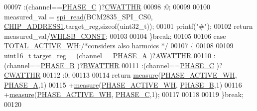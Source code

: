 \begin{DoxyCode}
00097                                           :(channel==\hyperlink{a00043_a3ceb83fb10c2af19b468d508448f24e2}{PHASE\_C} )?\hyperlink{a00036_ad685baf76950c0387bedffa9bb3272a9}{CWATTHR}
00098                                           :0;           
00099                                           
00100                     measured\_val = \hyperlink{a00007_ga7ad9f65ee46aca507374096506a0b1c4}{spi\_read}(BCM2835\_SPI\_CS0,
      \hyperlink{a00037_a94de2b046db6e10257ef4481c0a15eaa}{CHIP\_ADDRESS1},target\_reg,\textcolor{keyword}{sizeof}(uint32\_t));
00101                     printf(\textcolor{stringliteral}{"#"});
00102                     \textcolor{keywordflow}{return} measured\_val/\hyperlink{a00037_a75a052821a52067f93124e0c7ddcfdc3}{WHLSB\_CONST};
00103                 
00104                 \}\textcolor{keywordflow}{break};
00105                 
00106                 \textcolor{keywordflow}{case}  \hyperlink{a00043_ad8d2fc353ef124a8144e6d8264e43d1a}{TOTAL\_ACTIVE\_WH}:\textcolor{comment}{/*considers also harmoics */}
00107                 \{
00108                     
00109                     uint16\_t target\_reg =  (channel==\hyperlink{a00043_ad214039f52b011ce2bd6c85ff98a981b}{PHASE\_A} )?\hyperlink{a00036_ae66c97ed86f47fd938f143a30a8b2f7e}{AWATTHR}
00110                                           :(channel==\hyperlink{a00043_ad7b96feed1e1c12515dad5e926b2c62e}{PHASE\_B} )?\hyperlink{a00036_a185c6910fa47f7e973f0f8743ef0e8ad}{BWATTHR}
00111                                           :(channel==\hyperlink{a00043_a3ceb83fb10c2af19b468d508448f24e2}{PHASE\_C} )?\hyperlink{a00036_ad685baf76950c0387bedffa9bb3272a9}{CWATTHR}
00112                                           :0;           
00113                     
00114                      \textcolor{keywordflow}{return}  \hyperlink{a00009_gac914ebaa64afce03ee852af09659cf69}{measure}(\hyperlink{a00043_a4ee773ad07fa969b9990f9bb3a1a2093}{PHASE\_ACTIVE\_WH},
      \hyperlink{a00043_ad214039f52b011ce2bd6c85ff98a981b}{PHASE\_A},1)
00115                             +\hyperlink{a00009_gac914ebaa64afce03ee852af09659cf69}{measure}(\hyperlink{a00043_a4ee773ad07fa969b9990f9bb3a1a2093}{PHASE\_ACTIVE\_WH},
      \hyperlink{a00043_ad7b96feed1e1c12515dad5e926b2c62e}{PHASE\_B},1)
00116                             +\hyperlink{a00009_gac914ebaa64afce03ee852af09659cf69}{measure}(\hyperlink{a00043_a4ee773ad07fa969b9990f9bb3a1a2093}{PHASE\_ACTIVE\_WH},
      \hyperlink{a00043_a3ceb83fb10c2af19b468d508448f24e2}{PHASE\_C},1);
00117                      
00118                 
00119                 \}\textcolor{keywordflow}{break};
00120                 

\end{DoxyCode}
